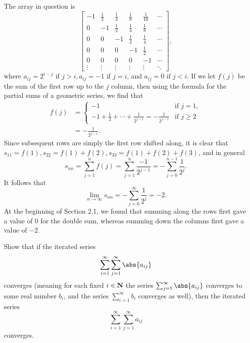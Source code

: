\documentclass{lew98_solutions}
\begin{document}
\begin{solution}
    The array in question is
    \[
        \begin{bmatrix}
            -1 & \tfrac{1}{2} & \tfrac{1}{4} & \tfrac{1}{8} & \tfrac{1}{16} & \cdots \\[3mm]
            0 & -1 & \tfrac{1}{2} & \tfrac{1}{4} & \tfrac{1}{8} & \cdots \\[3mm]
            0 & 0 & -1 & \tfrac{1}{2} & \tfrac{1}{4} & \cdots \\[3mm]
            0 & 0 & 0 & -1 & \tfrac{1}{2} & \cdots \\[3mm]
            0 & 0 & 0 & 0 & -1 & \cdots \\[1mm]
            \vdots & \vdots & \vdots & \vdots & \vdots & \ddots
        \end{bmatrix},
    \]
    where \( a_{ij} = 2^{i-j} \) if \( j > i, a_{ij} = -1 \) if \( j = i \), and \( a_{ij} = 0 \) if \( j < i \). If we let \( f(j) \) be the sum of the first row up to the \( j \) column, then using the formula for the partial sums of a geometric series, we find that
    \begin{align*}
        f(j) &= \begin{cases}
            -1 & \text{if } j = 1, \\
            -1 + \tfrac{1}{2} + \cdots + \tfrac{1}{2^{j-1}} = -\tfrac{1}{2^{j-1}} & \text{if } j \geq 2
        \end{cases} \\[2mm]
        &= -\frac{1}{2^{j-1}}.
    \end{align*}
    Since subsequent rows are simply the first row shifted along, it is clear that \( s_{11} = f(1), s_{22} = f(1) + f(2), s_{33} = f(1) + f(2) + f(3) \), and in general
    \[
        s_{nn} = \sum_{j=1}^n f(j) = \sum_{j=1}^n \frac{-1}{2^{j-1}} = -\sum_{j=0}^{n-1} \frac{1}{2^j}.
    \]
    It follows that
    \[
        \lim_{n \to \infty} s_{nn} = -\sum_{j=0}^{\infty} \frac{1}{2^j} = -2.
    \]
    At the beginning of Section 2.1, we found that summing along the rows first gave a value of 0 for the double sum, whereas summing down the columns first gave a value of \( -2 \).
\end{solution}

\begin{exercise}
\label{ex:2.8.2}
    Show that if the iterated series
    \[
        \sum_{i=1}^{\infty} \sum_{j=1}^{\infty} \abs{a_{ij}}
    \]
    converges (meaning for each fixed \( i \in \mathbf{N} \) the series \( \sum_{j=1}^{\infty} \abs{a_{ij}} \) converges to some real number \( b_i \), and the series \( \sum_{i=1}^{\infty} b_i \) converges as well), then the iterated series
    \[
        \sum_{i=1}^{\infty} \sum_{j=1}^{\infty} a_{ij}
    \]
    converges.
\end{exercise}
\end{document}
